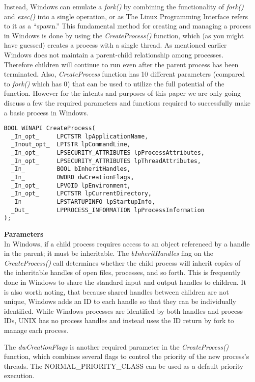 \documentclass[11pt]{report}
\begin{document}
Instead, Windows can emulate a \textit{fork()} by combining the functionality of \textit{fork()} and \textit{exec()} into a single operation, or as The Linux Programming Interface refers to it as a “spawn.” This fundamental method for creating and managing a process in Windows is done by using the \textit{CreateProcess()} function, which (as you might have guessed) creates a process with a single thread. As mentioned earlier Windows does not maintain a parent-child relationship among processes. Therefore children will continue to run even after the parent process has been terminated.  Also, \textit{CreateProcess} function has 10  different parameters (compared to \textit{fork()} which has 0) that can be used to utilize the full potential of the function. However for the intents and purposes of this paper we are only going discuss a few the required parameters and functions required to successfully make a basic process in Windows.

\begin{verbatim}
BOOL WINAPI CreateProcess(
  _In_opt_     LPCTSTR lpApplicationName,
  _Inout_opt_  LPTSTR lpCommandLine,
  _In_opt_     LPSECURITY_ATTRIBUTES lpProcessAttributes,
  _In_opt_     LPSECURITY_ATTRIBUTES lpThreadAttributes,
  _In_         BOOL bInheritHandles,
  _In_         DWORD dwCreationFlags,
  _In_opt_     LPVOID lpEnvironment,
  _In_opt_     LPCTSTR lpCurrentDirectory,
  _In_         LPSTARTUPINFO lpStartupInfo,
  _Out_        LPPROCESS_INFORMATION lpProcessInformation
);
\end{verbatim}

\textbf{\large Parameters}\\
In Windows, if a child process requires access to an object referenced by a handle in the parent; it must be inheritable. The \textit{bInheritHandles} flag on the \textit{CreateProcess()} call determines whether the child process will inherit copies of the inheritable handles of open files, processes, and so forth. This is frequently done in Windows to share the standard input and output handles to children. It is also worth noting, that because shared handles between children are not unique, Windows adds an ID to each handle so that they can be individually identified. While Windows processes are identified by both handles and process IDs, UNIX has no process handles and instead uses the ID return by fork to manage each process.

The \textit{dwCreationFlags} is another required parameter in the \textit{CreateProcess()} function, which combines several flags to control the priority of the new process’s threads. The NORMAL\_PRIORITY\_CLASS can be used as a default priority execution.
\end{document}
